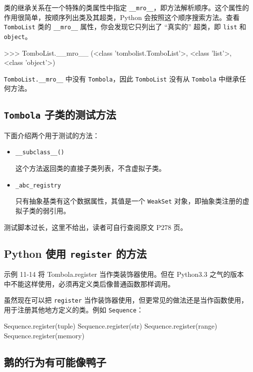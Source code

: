 类的继承关系在一个特殊的类属性中指定 \texttt{\_\_mro\_\_}，即方法解析顺序。这个属性的作用很简单，按顺序列出类及其超类，Python 会按照这个顺序搜索方法。查看 \texttt{TomboList} 类的 \texttt{\_\_mro\_\_} 属性，你会发现它只列出了 ``真实的'' 超类，即 \texttt{list} 和 \texttt{object}。

\begin{python}
>>> TomboList.__mro__
(<class 'tombolist.TomboList'>, <class 'list'>, <class 'object'>)
\end{python}

\texttt{TomboList.\_\_mro\_\_} 中没有 \texttt{Tombola}，因此 \texttt{TomboList} 没有从 \texttt{Tombola} 中继承任何方法。

\subsection{\texttt{Tombola} 子类的测试方法}

下面介绍两个用于测试的方法：
\begin{itemize}
    \item \texttt{\_\_subclass\_\_()} 
    
    这个方法返回类的直接子类列表，不含虚拟子类。

    \item \texttt{\_abc\_registry}
    
    只有抽象基类有这个数据属性，其值是一个 \texttt{WeakSet} 对象，即抽象类注册的虚拟子类的弱引用。
\end{itemize}

测试脚本过长，这里不给出，读者可自行查阅原文 P278 页。

\subsection{Python 使用 \texttt{register} 的方法}

示例 11-14 将 Tombola.register 当作类装饰器使用。但在 Python3.3 之气的版本中不能这样使用，必须再定义类后像普通函数那样调用。

虽然现在可以把 \texttt{register} 当作装饰器使用，但更常见的做法还是当作函数使用，用于注册其他地方定义的类。例如 \texttt{Sequence}：

\begin{python}
Sequence.register(tuple)
Sequence.register(str)
Sequence.register(range)
Sequence.register(memory)
\end{python}

\subsection{鹅的行为有可能像鸭子}

